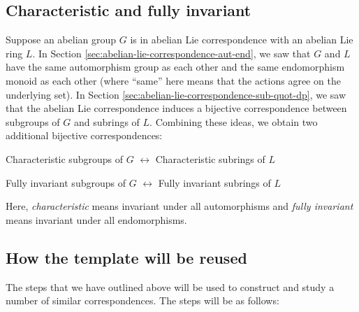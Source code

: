 \subsection{Characteristic and fully invariant}

Suppose an abelian group $G$ is in abelian Lie correspondence with an
abelian Lie ring $L$. In Section
\ref{sec:abelian-lie-correspondence-aut-end}, we saw that $G$ and $L$
have the same automorphism group as each other and the same
endomorphism monoid as each other (where ``same'' here means that the
actions agree on the underlying set). In Section
\ref{sec:abelian-lie-correspondence-sub-quot-dp}, we saw that the
abelian Lie correspondence induces a bijective correspondence between
subgroups of $G$ and subrings of $L$. Combining these ideas, we obtain
two additional bijective correspondences:

\begin{center}
  Characteristic subgroups of $G$ $\leftrightarrow$ Characteristic
  subrings of $L$
\end{center}

\begin{center}
  Fully invariant subgroups of $G$ $\leftrightarrow$ Fully invariant
  subrings of $L$
\end{center}

Here, {\em characteristic} means invariant under all automorphisms and
{\em fully invariant} means invariant under all endomorphisms.

\subsection{How the template will be reused}\label{sec:isocat-template}

The steps that we have outlined above will be used to construct and
study a number of similar correspondences. The steps will be as
follows:

